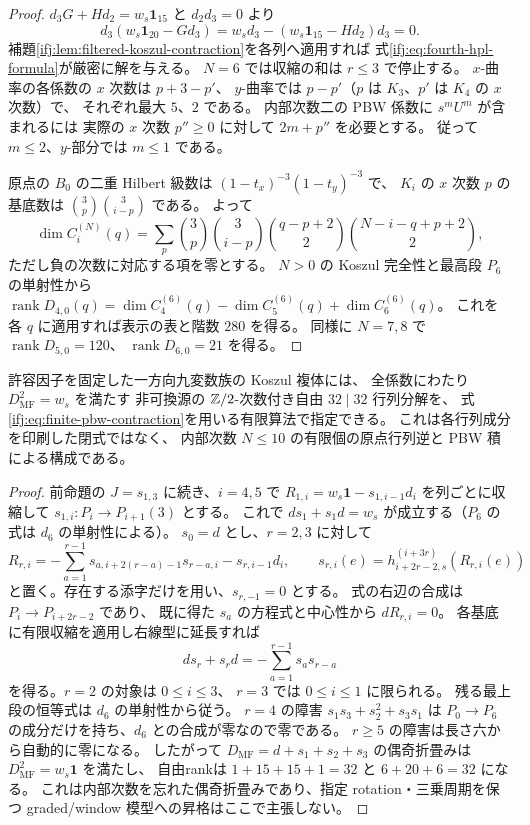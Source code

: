 \begin{proof}
$d_3G+Hd_2=w_s\mathbf1_{15}$ と $d_2d_3=0$ より
\[
 d_3(w_s\mathbf1_{20}-Gd_3)
 =w_sd_3-(w_s\mathbf1_{15}-Hd_2)d_3=0.
\]
補題\ref{ifj:lem:filtered-koszul-contraction}を各列へ適用すれば
式\eqref{ifj:eq:fourth-hpl-formula}が厳密に解を与える。
$N=6$ では収縮の和は $r\le3$ で停止する。
$x$-曲率の各係数の $x$ 次数は $p+3-p'$、
$y$-曲率では $p-p'$（$p$ は $K_3$、$p'$ は $K_4$ の $x$ 次数）で、
それぞれ最大 $5$、$2$ である。
内部次数二の PBW 係数に $s^mU^m$ が含まれるには
実際の $x$ 次数 $p''\ge0$ に対して $2m+p''$ を必要とする。
従って $m\le2$、$y$-部分では $m\le1$ である。

原点の $B_0$ の二重 Hilbert 級数は
$(1-t_x)^{-3}(1-t_y)^{-3}$ で、
$K_i$ の $x$ 次数 $p$ の基底数は
$\binom3p\binom3{i-p}$ である。
よって
\[
 \dim C_i^{(N)}(q)=
 \sum_p\binom3p\binom3{i-p}
 \binom{q-p+2}{2}\binom{N-i-q+p+2}{2},
\]
ただし負の次数に対応する項を零とする。
$N>0$ の Koszul 完全性と最高段 $P_6$ の単射性から
$\operatorname{rank}D_{4,0}(q)
=\dim C_4^{(6)}(q)-\dim C_5^{(6)}(q)+\dim C_6^{(6)}(q)$。
これを各 $q$ に適用すれば表示の表と階数 $280$ を得る。
同様に $N=7,8$ で $\operatorname{rank}D_{5,0}=120$、
$\operatorname{rank}D_{6,0}=21$ を得る。
\end{proof}

\begin{corollary}
\label{ifj:cor:finite-shamash-source-mf}
許容因子を固定した一方向九変数族の Koszul 複体には、
全係数にわたり $D_{\mathrm{MF}}^2=w_s$ を満たす
非可換源の $\mathbb Z/2$-次数付き自由 $32\mid32$ 行列分解を、
式\eqref{ifj:eq:finite-pbw-contraction}を用いる有限算法で指定できる。
これは各行列成分を印刷した閉式ではなく、
内部次数 $N\le10$ の有限個の原点行列逆と PBW 積による構成である。
\end{corollary}

\begin{proof}
前命題の $J=s_{1,3}$ に続き、$i=4,5$ で
$R_{1,i}=w_s\mathbf1-s_{1,i-1}d_i$ を列ごとに収縮して
$s_{1,i}:P_i\to P_{i+1}(3)$ とする。
これで $ds_1+s_1d=w_s$ が成立する（$P_6$ の式は $d_6$ の単射性による）。
$s_0=d$ とし、$r=2,3$ に対して
\begin{equation}\label{ifj:eq:higher-shamash-recursion}
 R_{r,i}=-\sum_{a=1}^{r-1}s_{a,i+2(r-a)-1}s_{r-a,i}
          -s_{r,i-1}d_i,
 \qquad s_{r,i}(e)=h_{i+2r-2,s}^{(i+3r)}(R_{r,i}(e))
\end{equation}
と置く。存在する添字だけを用い、$s_{r,-1}=0$ とする。
式の右辺の合成は $P_i\to P_{i+2r-2}$ であり、
既に得た $s_a$ の方程式と中心性から $dR_{r,i}=0$。
各基底に有限収縮を適用し右線型に延長すれば
\[
 ds_r+s_rd=-\sum_{a=1}^{r-1}s_as_{r-a}
\]
を得る。$r=2$ の対象は $0\le i\le3$、
$r=3$ では $0\le i\le1$ に限られる。
残る最上段の恒等式は $d_6$ の単射性から従う。
$r=4$ の障害 $s_1s_3+s_2^2+s_3s_1$ は
$P_0\to P_6$ の成分だけを持ち、$d_6$ との合成が零なので零である。
$r\ge5$ の障害は長さ六から自動的に零になる。
したがって $D_{\mathrm{MF}}=d+s_1+s_2+s_3$ の偶奇折畳みは
$D_{\mathrm{MF}}^2=w_s\mathbf1$ を満たし、
自由rankは $1+15+15+1=32$ と $6+20+6=32$ になる。
これは内部次数を忘れた偶奇折畳みであり、指定 rotation・三乗周期を保つ
graded/window 模型への昇格はここで主張しない。
\end{proof}

